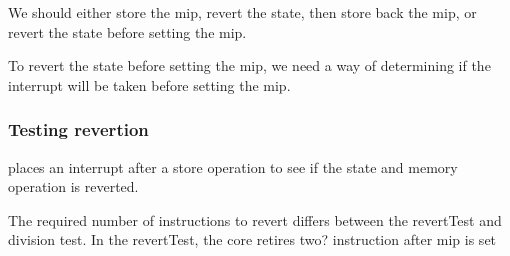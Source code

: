 We should either store the mip, revert the state, then store back the mip, or revert the state before setting the mip.

To revert the state before setting the mip, we need a way of determining if the interrupt will be taken before setting the mip. 

\subsubsection{Testing revertion}

 places an interrupt after a store operation to see if the state and memory operation is reverted.

The required number of instructions to revert differs between the revertTest and division test. In the revertTest, the core retires two? instruction after mip is set
